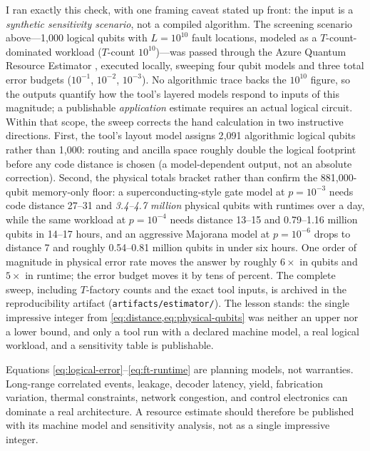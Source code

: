 I ran exactly this check, with one framing caveat stated up front: the input is a \emph{synthetic sensitivity scenario}, not a compiled algorithm. The screening scenario above---1{,}000 logical qubits with $L=10^{10}$ fault locations, modeled as a $T$-count-dominated workload ($T$-count $10^{10}$)---was passed through the Azure Quantum Resource Estimator \citep{beverland2022}, executed locally, sweeping four qubit models and three total error budgets ($10^{-1}$, $10^{-2}$, $10^{-3}$). No algorithmic trace backs the $10^{10}$ figure, so the outputs quantify how the tool's layered models respond to inputs of this magnitude; a publishable \emph{application} estimate requires an actual logical circuit. Within that scope, the sweep corrects the hand calculation in two instructive directions. First, the tool's layout model assigns 2{,}091 algorithmic logical qubits rather than 1{,}000: routing and ancilla space roughly double the logical footprint before any code distance is chosen (a model-dependent output, not an absolute correction). Second, the physical totals bracket rather than confirm the 881{,}000-qubit memory-only floor: a superconducting-style gate model at $p=10^{-3}$ needs code distance 27--31 and \emph{3.4--4.7 million} physical qubits with runtimes over a day, while the same workload at $p=10^{-4}$ needs distance 13--15 and 0.79--1.16 million qubits in 14--17 hours, and an aggressive Majorana model at $p=10^{-6}$ drops to distance 7 and roughly 0.54--0.81 million qubits in under six hours. One order of magnitude in physical error rate moves the answer by roughly $6\times$ in qubits and $5\times$ in runtime; the error budget moves it by tens of percent. The complete sweep, including $T$-factory counts and the exact tool inputs, is archived in the reproducibility artifact (\texttt{artifacts/estimator/}). The lesson stands: the single impressive integer from \cref{eq:distance,eq:physical-qubits} was neither an upper nor a lower bound, and only a tool run with a declared machine model, a real logical workload, and a sensitivity table is publishable.

\begin{warningbox}
Equations \eqref{eq:logical-error}--\eqref{eq:ft-runtime} are planning models, not warranties. Long-range correlated events, leakage, decoder latency, yield, fabrication variation, thermal constraints, network congestion, and control electronics can dominate a real architecture. A resource estimate should therefore be published with its machine model and sensitivity analysis, not as a single impressive integer.
\end{warningbox}
